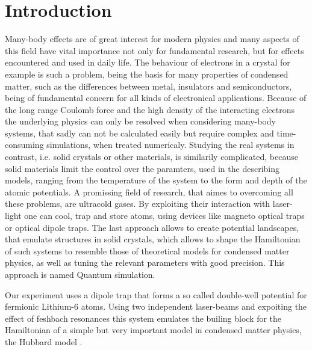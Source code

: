 \chapter{Introduction}

Many-body effects are of great interest for modern physics and many aspects of this field have vital importance not only for fundamental research, but for effects encountered and used in daily life. The behaviour of electrons in a crystal for example is such a problem, being the basis for many properties of condensed matter, such as the differences between metal, insulators and semiconductors, being of fundamental concern for all kinds of electronical applications. Because of the long range Coulomb force and the high density of the interacting electrons the underlying physics can only be resolved when considering many-body systems, that sadly can not be calculated easily but require complex and time-consuming simulations, when treated numericaly. Studying the real systems in contrast, i.e. solid crystals or other materials, is similarily complicated, because solid materials limit the control over the paramters, used in the describing models, ranging from the temperature of the system to the form and depth of the atomic potentials. A promissing field of research, that aimes to overcoming all these problems, are ultracold gases. By exploiting their interaction with laser-light one can cool, trap and store atoms, using devices like magneto optical traps or optical dipole traps\cite{metcalf}. The last approach allows to create potential landscapes, that emulate structures in solid crystals, which allows to shape the Hamiltonian of such systems to resemble those of theoretical models for condensed matter physics, as well as tuning the relevant parameters with good precision. This approach is named Quantum simulation.

Our experiment uses a dipole trap that forms a so called double-well potential for fermionic Lithium-6 atoms. Using two independent laser-beams and expoiting the effect of feshbach resonances this system emulates the builing block for the Hamiltonian of a simple but very important model in condensed matter physics, the Hubbard model \cite{doublewell}.

